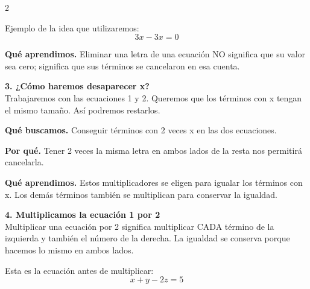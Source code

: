 \documentclass[11pt,a4paper,landscape]{article}
\begin{document}
\begin{multicols*}{2}
\begin{minipage}{\linewidth}
\par\smallskip Ejemplo de la idea que utilizaremos:
\[3x-3x=0\]
\par\smallskip\textbf{Qué aprendimos.} Eliminar una letra de una ecuación NO significa que su valor sea cero; significa que sus términos se cancelaron en esa cuenta.
\end{minipage}\par\medskip
\noindent\begin{minipage}{\linewidth}\textbf{3. ¿Cómo haremos desaparecer x?}\\[2pt]Trabajaremos con las ecuaciones 1 y 2. Queremos que los términos con x tengan el mismo tamaño. Así podremos restarlos.
\par\smallskip\textbf{Qué buscamos.} Conseguir términos con 2 veces x en las dos ecuaciones.
\par\smallskip\textbf{Por qué.} Tener 2 veces la misma letra en ambos lados de la resta nos permitirá cancelarla.
\par{}\par\smallskip
\par\smallskip\textbf{Qué aprendimos.} Estos multiplicadores se eligen para igualar los términos con x. Los demás términos también se multiplican para conservar la igualdad.
\end{minipage}\par\medskip
\noindent\begin{minipage}{\linewidth}\textbf{4. Multiplicamos la ecuación 1 por 2}\\[2pt]Multiplicar una ecuación por 2 significa multiplicar CADA término de la izquierda y también el número de la derecha. La igualdad se conserva porque hacemos lo mismo en ambos lados.
\par\smallskip Esta es la ecuación antes de multiplicar:
\[x + y - 2z = 5\]

\end{minipage}
\end{multicols*}
\end{document}
